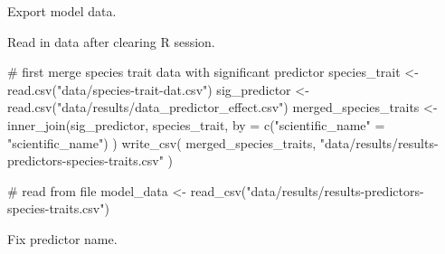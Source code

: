 \documentclass[
]{article}
\newenvironment{Shaded}{}{}
\newcommand{\CharTok}[1]{\textcolor[rgb]{0.00,0.50,0.50}{#1}}
\newcommand{\CommentTok}[1]{\textcolor[rgb]{0.00,0.50,0.00}{#1}}
\newcommand{\ControlFlowTok}[1]{\textcolor[rgb]{0.00,0.00,1.00}{#1}}
\newcommand{\DataTypeTok}[1]{#1}
\newcommand{\KeywordTok}[1]{\textcolor[rgb]{0.00,0.00,1.00}{#1}}
\newcommand{\NormalTok}[1]{#1}
\newcommand{\OperatorTok}[1]{#1}
\newcommand{\StringTok}[1]{\textcolor[rgb]{0.00,0.50,0.50}{#1}}
\begin{document}
Export model data.

\begin{Shaded}
\end{Shaded}

Read in data after clearing R session.

\begin{Shaded}
\begin{Highlighting}[]
\CommentTok{# first merge species trait data with significant predictor}
\NormalTok{species_trait <-}\StringTok{ }\KeywordTok{read.csv}\NormalTok{(}\StringTok{"data/species-trait-dat.csv"}\NormalTok{)}
\NormalTok{sig_predictor <-}\StringTok{ }\KeywordTok{read.csv}\NormalTok{(}\StringTok{"data/results/data_predictor_effect.csv"}\NormalTok{)}
\NormalTok{merged_species_traits <-}\StringTok{ }\KeywordTok{inner_join}\NormalTok{(sig_predictor, species_trait,}
  \DataTypeTok{by =} \KeywordTok{c}\NormalTok{(}\StringTok{"scientific_name"}\NormalTok{ =}\StringTok{ "scientific_name"}\NormalTok{)}
\NormalTok{)}
\KeywordTok{write_csv}\NormalTok{(}
\NormalTok{  merged_species_traits,}
  \StringTok{"data/results/results-predictors-species-traits.csv"}
\NormalTok{)}


\CommentTok{# read from file}
\NormalTok{model_data <-}\StringTok{ }\KeywordTok{read_csv}\NormalTok{(}\StringTok{"data/results/results-predictors-species-traits.csv"}\NormalTok{)}
\end{Highlighting}
\end{Shaded}

Fix predictor name.

\begin{Shaded}
\end{Shaded}
\end{document}
